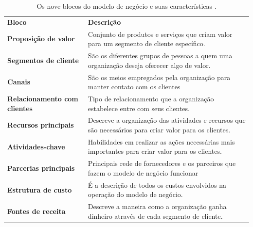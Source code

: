 \begin{table}[H]
 \centering
 {\renewcommand\arraystretch{1.25}
 \caption{Os nove blocos do modelo de negócio e suas características \cite{bmctese2004} \cite{bmc2011}.}
 \label{tab:9blocos}
 \begin{tabular}{ l l }
  \cline{1-1}\cline{2-2}  
    \multicolumn{1}{|p{3.083cm}|}{\textbf{Bloco}} &
    \multicolumn{1}{p{7.283cm}|}{\textbf{Descrição}}
  \\  
  \cline{1-1}\cline{2-2}  
    \multicolumn{1}{|p{3.083cm}|}{\textbf{Proposição de valor}} &
    \multicolumn{1}{p{7.283cm}|}{Conjunto de produtos e serviços que criam valor para um segmento de cliente específico.}
  \\  
  \cline{1-1}\cline{2-2}  
    \multicolumn{1}{|p{3.083cm}|}{\textbf{Segmentos de cliente}} &
    \multicolumn{1}{p{7.283cm}|}{São os diferentes grupos de pessoas a quem uma organização deseja oferecer algo de valor.}
  \\  
  \cline{1-1}\cline{2-2}  
    \multicolumn{1}{|p{3.083cm}|}{\textbf{Canais}} &
    \multicolumn{1}{p{7.283cm}|}{São os meios empregados pela organização para manter contato com os clientes}
  \\  
  \cline{1-1}\cline{2-2}  
    \multicolumn{1}{|p{3.083cm}|}{\textbf{Relacionamento com clientes}} &
    \multicolumn{1}{p{7.283cm}|}{Tipo de relacionamento que a organização estabelece entre com seus clientes.  }
  \\  
  \cline{1-1}\cline{2-2}  
    \multicolumn{1}{|p{3.083cm}|}{\textbf{Recursos principais}} &
    \multicolumn{1}{p{7.283cm}|}{Descreve a organização das atividades e recursos que são necessários para criar valor para os clientes.}
  \\  
  \cline{1-1}\cline{2-2}  
    \multicolumn{1}{|p{3.083cm}|}{\textbf{Atividades-chave}} &
    \multicolumn{1}{p{7.283cm}|}{Habilidades em realizar as ações necessárias mais importantes para criar valor para os clientes. }
  \\  
  \cline{1-1}\cline{2-2}  
    \multicolumn{1}{|p{3.083cm}|}{\textbf{Parcerias principais}} &
    \multicolumn{1}{p{7.283cm}|}{Principais rede de fornecedores e os parceiros que fazem o modelo de negócio funcionar}
  \\  
  \cline{1-1}\cline{2-2}  
    \multicolumn{1}{|p{3.083cm}|}{\textbf{Estrutura de custo}} &
    \multicolumn{1}{p{7.283cm}|}{É a descrição de todos os custos envolvidos na operação do modelo de negócio. }
  \\  
  \cline{1-1}\cline{2-2}  
    \multicolumn{1}{|p{3.083cm}|}{\textbf{Fontes de receita}} &
    \multicolumn{1}{p{7.283cm}|}{Descreve a maneira como a organização ganha dinheiro através de cada segmento de cliente. }
  \\  
  \hline

 \end{tabular} }
\end{table}

